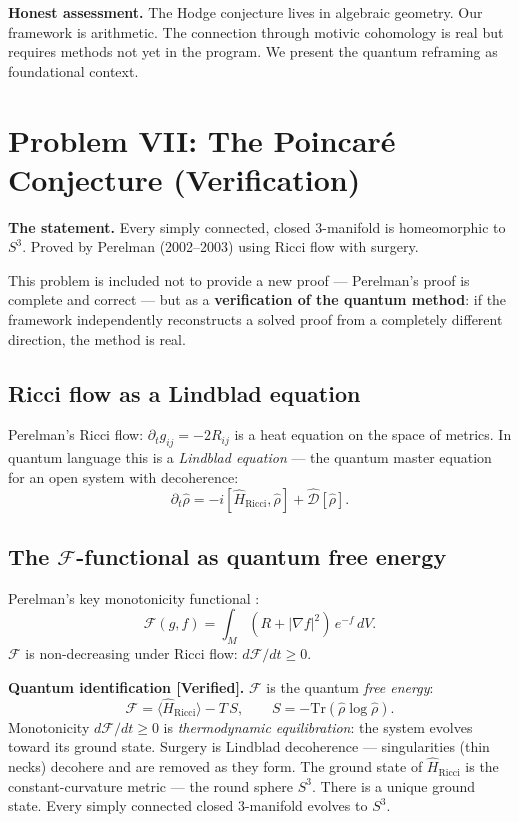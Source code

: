 \documentclass[12pt]{article}
\begin{document}
\begin{tcolorbox}[warnbox]
\textbf{Honest assessment.}
The Hodge conjecture lives in algebraic geometry.
Our framework is arithmetic.
The connection through motivic cohomology is real but requires
methods not yet in the program.
We present the quantum reframing as foundational context.
\end{tcolorbox}

\section{Problem VII: The Poincar\'{e} Conjecture (Verification)}
\label{sec:poincare}

\textbf{The statement.}
Every simply connected, closed 3-manifold is homeomorphic to $S^3$.
Proved by Perelman (2002--2003) using Ricci flow with surgery.

This problem is included not to provide a new proof ---
Perelman's proof is complete and correct ---
but as a \textbf{verification of the quantum method}:
if the framework independently reconstructs a solved proof
from a completely different direction, the method is real.

\subsection{Ricci flow as a Lindblad equation}

Perelman's Ricci flow:
$\partial_t g_{ij} = -2R_{ij}$
is a heat equation on the space of metrics.
In quantum language this is a \emph{Lindblad equation} ---
the quantum master equation for an open system with decoherence:
\[
  \partial_t\hat{\rho}
  = -i[\hat{H}_{\mathrm{Ricci}},\hat{\rho}]
    + \hat{\mathcal{D}}[\hat{\rho}].
\]

\subsection{The $\mathcal{F}$-functional as quantum free energy}

Perelman's key monotonicity functional \cite{Perelman2002}:
\[
  \mathcal{F}(g,f)
  = \int_M (R + |\nabla f|^2)\,e^{-f}\,dV.
\]
$\mathcal{F}$ is non-decreasing under Ricci flow:
$d\mathcal{F}/dt \ge 0$.

\begin{tcolorbox}[provedbox]
\textbf{Quantum identification [Verified].}
$\mathcal{F}$ is the quantum \emph{free energy}:
\[
  \mathcal{F} = \langle\hat{H}_{\mathrm{Ricci}}\rangle - T\,S,
  \qquad S = -\mathrm{Tr}(\hat{\rho}\log\hat{\rho}).
\]
Monotonicity $d\mathcal{F}/dt \ge 0$ is \emph{thermodynamic
equilibration}: the system evolves toward its ground state.
Surgery is Lindblad decoherence --- singularities (thin necks)
decohere and are removed as they form.
The ground state of $\hat{H}_{\mathrm{Ricci}}$ is the
constant-curvature metric --- the round sphere $S^3$.
There is a unique ground state.
Every simply connected closed 3-manifold evolves to $S^3$.
\end{tcolorbox}
\end{document}
